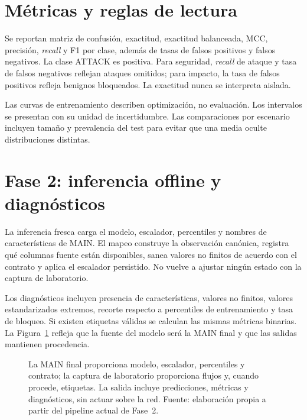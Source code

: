 \section{Métricas y reglas de lectura}

Se reportan matriz de confusión, exactitud, exactitud balanceada, MCC, precisión, \emph{recall} y F1 por clase, además de tasas de falsos positivos y falsos negativos. La clase ATTACK es positiva. Para seguridad, \emph{recall} de ataque y tasa de falsos negativos reflejan ataques omitidos; para impacto, la tasa de falsos positivos refleja benignos bloqueados. La exactitud nunca se interpreta aislada.

Las curvas de entrenamiento describen optimización, no evaluación. Los intervalos se presentan con su unidad de incertidumbre. Las comparaciones por escenario incluyen tamaño y prevalencia del test para evitar que una media oculte distribuciones distintas.

\section{Fase 2: inferencia offline y diagnósticos}

La inferencia fresca carga el modelo, escalador, percentiles y nombres de características de MAIN. El mapeo construye la observación canónica, registra qué columnas fuente están disponibles, sanea valores no finitos de acuerdo con el contrato y aplica el escalador persistido. No vuelve a ajustar ningún estado con la captura de laboratorio.

Los diagnósticos incluyen presencia de características, valores no finitos, valores estandarizados extremos, recorte respecto a percentiles de entrenamiento y tasa de bloqueo. Si existen etiquetas válidas se calculan las mismas métricas binarias. La Figura~\ref{fig:pipeline-fase2} refleja que la fuente del modelo será la MAIN final y que las salidas mantienen procedencia.

\begin{figure}[htbp]
\centering

\caption[Pipeline de inferencia offline de la Fase 2]{La MAIN final proporciona modelo, escalador, percentiles y contrato; la captura de laboratorio proporciona flujos y, cuando procede, etiquetas. La salida incluye predicciones, métricas y diagnósticos, sin actuar sobre la red. Fuente: elaboración propia a partir del pipeline actual de Fase~2.}
\label{fig:pipeline-fase2}
\end{figure}

